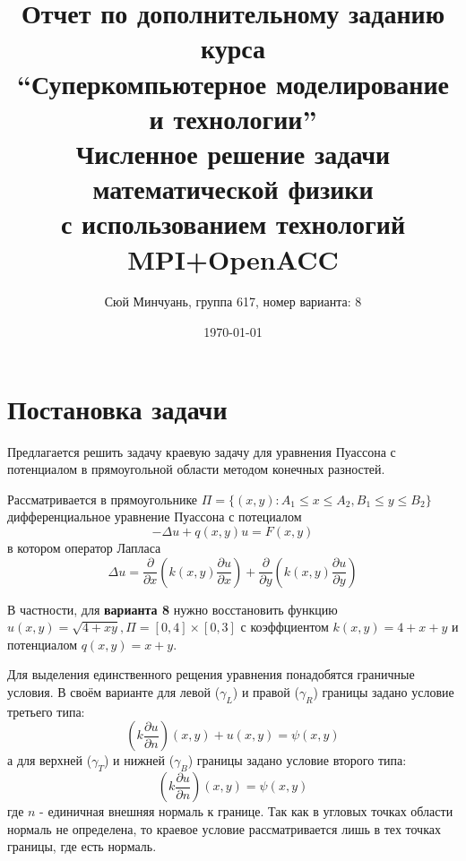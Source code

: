\documentclass{article}
\title{Отчет по дополнительному заданию курса \\
“Суперкомпьютерное моделирование и технологии”\\
Численное решение задачи математической физики \\
с использованием технологий MPI+OpenACC}
\author{Сюй Минчуань, группа 617, номер варианта: 8}
\date{\today}
\begin{document}
\maketitle
\tableofcontents

\newpage
\section{Постановка задачи}

Предлагается решить задачу краевую задачу для уравнения Пуассона с потенциалом в прямоугольной области методом конечных разностей.

Рассматривается в прямоугольнике $\Pi = \{(x,y): A_1 \leqslant x \leqslant A_2, B_1 \leqslant y \leqslant B_2\}$ дифференциальное уравнение Пуассона с потециалом
\begin{equation*}
    -\Delta u + q(x,y)u = F(x,y)
\end{equation*}
в котором оператор Лапласа 
\begin{equation*}
    \Delta u = \frac{\partial}{\partial x} \left(k(x,y)\frac{\partial u}{\partial x} \right) + \frac{\partial}{\partial y}\left(k(x,y)\frac{\partial u}{\partial y} \right)
\end{equation*}

В частности, для \textbf{варианта 8} нужно восстановить функцию $u(x,y)=\sqrt{4+xy}, \Pi = [0,4] \times [0,3]$ с коэффциентом $k(x,y) = 4 + x + y$ и потенциалом $q(x,y) = x + y$. 

Для выделения единственного рещения уравнения понадобятся граничные условия. В своём варианте для левой ($\gamma_L$) и правой ($\gamma_R$) границы задано условие третьего типа:
\begin{equation*}
    \left( k\frac{\partial u}{\partial n}\right)(x,y) + u(x,y) = \psi(x,y)
\end{equation*}
а для верхней ($\gamma_T$) и нижней ($\gamma_B$) границы задано условие второго типа:
\begin{equation*}
    \left( k\frac{\partial u}{\partial n}\right)(x,y) = \psi(x,y)
\end{equation*}
где $n$ - единичная внешняя нормаль к границе. Так как в угловых точках области нормаль не определена, то краевое условие рассматривается лишь в тех точках границы, где есть нормаль.
\end{document}
